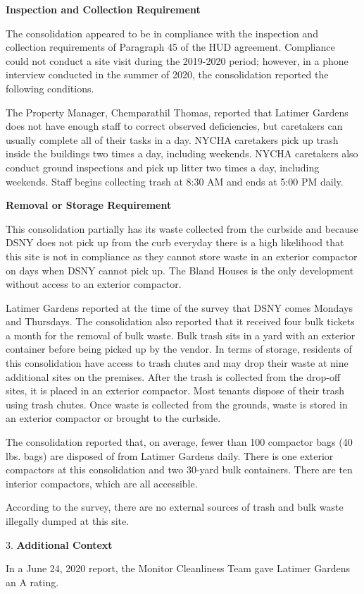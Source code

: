 
\textbf{Inspection and Collection Requirement}

The consolidation appeared to be in compliance with the inspection and collection requirements of Paragraph 45 of the HUD agreement. Compliance could not conduct a site visit during the 2019-2020 period; however, in a phone interview conducted in the summer of 2020, the consolidation reported the following conditions.

The Property Manager, Chemparathil Thomas, reported that Latimer Gardens does not have enough staff to correct observed deficiencies, but caretakers can usually complete all of their tasks in a day. NYCHA caretakers pick up trash inside the buildings two times a day, including weekends. NYCHA caretakers also conduct ground inspections and pick up litter two times a day, including weekends. Staff begins collecting trash at 8:30 AM and ends at 5:00 PM daily. 

\textbf{Removal or Storage Requirement}

This consolidation partially has its waste collected from the curbside and because DSNY does not pick up from the curb everyday there is a high likelihood that this site is not in compliance as they cannot store waste in an exterior compactor on days when DSNY cannot pick up. The Bland Houses is the only development without access to an exterior compactor.

Latimer Gardens reported at the time of the survey that DSNY comes Mondays and Thursdays. The consolidation also reported that it received four bulk tickets a month for the removal of bulk waste. Bulk trash sits in a yard with an exterior container before being picked up by the vendor. In terms of storage, residents of this consolidation have access to trash chutes and may drop their waste at nine additional sites on the premises. After the trash is collected from the drop-off sites, it is placed in an exterior compactor. Most tenants dispose of their trash using trash chutes. Once waste is collected from the grounds, waste is stored in an exterior compactor or brought to the curbside. 

The consolidation reported that, on average, fewer than 100 compactor bags (40 lbs. bags) are disposed of from Latimer Gardens daily. There is one exterior compactors at this consolidation and two 30-yard bulk containers. There are ten interior compactors, which are all accessible.

According to the survey, there are no external sources of trash and bulk waste illegally dumped at this site. 

3. \textbf{Additional Context} 

In a June 24, 2020 report, the Monitor Cleanliness Team gave Latimer Gardens an A rating. 